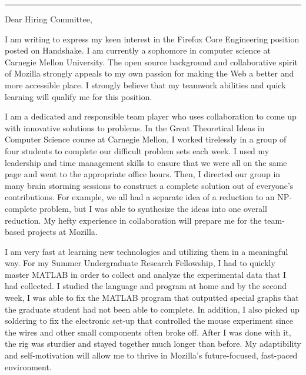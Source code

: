 \documentclass{kindofneat}
\begin{document}


\noindent\rule{\textwidth}{1pt}

\large

\vspace*{2em}

\noindent Dear Hiring Committee,

\vspace*{1em}

I am writing to express my keen interest in the Firefox Core Engineering position posted on Handshake. I am currently a sophomore in computer science at Carnegie Mellon University. The open source background and collaborative spirit of Mozilla strongly appeals to my own passion for making the Web a better and more accessible place. I strongly believe that my teamwork abilities and quick learning will qualify me for this position.

\vspace*{0.5em}

I am a dedicated and responsible team player who uses collaboration to come up with innovative solutions to problems. In the Great Theoretical Ideas in Computer Science course at Carnegie Mellon, I worked tirelessly in a group of four students to complete our difficult problem sets each week. I used my leadership and time management skills to ensure that we were all on the same page and went to the appropriate office hours. Then, I directed our group in many brain storming sessions to construct a complete solution out of everyone's contributions. For example, we all had a separate idea of a reduction to an NP-complete problem, but I was able to synthesize the ideas into one overall reduction. My hefty experience in collaboration will prepare me for the team-based projects at Mozilla. 

\vspace*{0.5em}
I am very fast at learning new technologies and utilizing them in a meaningful way. For my Summer Undergraduate Research Fellowship, I had to quickly master MATLAB in order to collect and analyze the experimental data that I had collected. I studied the language and program at home and by the second week, I was able to fix the MATLAB program that outputted special graphs that the graduate student had not been able to complete. In addition, I also picked up soldering to fix the electronic set-up that controlled the mouse experiment since the wires and other small components often broke off. After I was done with it, the rig was sturdier and stayed together much longer than before. My adaptibility and self-motivation will allow me to thrive in Mozilla's future-focused, fast-paced environment. 
\vspace*{0.5em}
\end{document}
